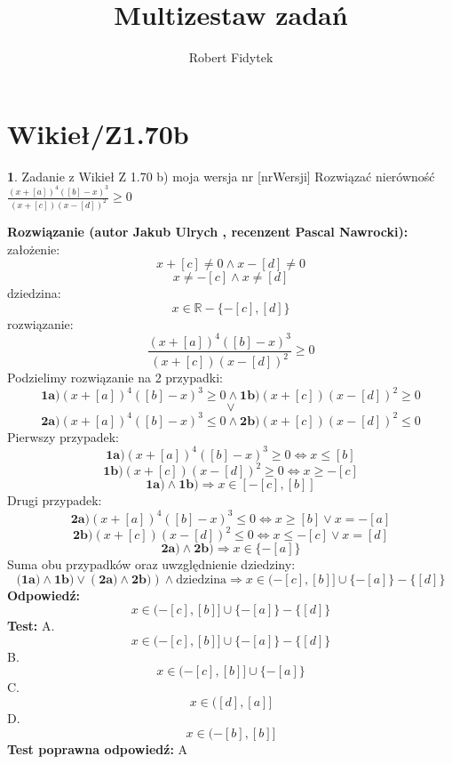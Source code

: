 \documentclass[12pt, a4paper]{article}
\title{Multizestaw zadań}
\author{Robert Fidytek}
\date{}
\theoremstyle{definition} %
\newtheorem{zad}{}
\newcommand{\kategoria}[1]{\section{#1}} %
\newcommand{\zadStart}[1]{\begin{zad}#1\newline} %
\newcommand{\zadStop}{\end{zad}}   %
\newcommand{\rozwStart}[2]{\noindent \textbf{Rozwiązanie (autor #1 , recenzent #2): }\newline} %
\newcommand{\rozwStop}{\newline}                                            %
\newcommand{\odpStart}{\noindent \textbf{Odpowiedź:}\newline}    %
\newcommand{\odpStop}{\newline}                                             %
\newcommand{\testStart}{\noindent \textbf{Test:}\newline} %
\newcommand{\testStop}{\newline} %
\newcommand{\kluczStart}{\noindent \textbf{Test poprawna odpowiedź:}\newline} %
\newcommand{\kluczStop}{\newline} %
\begin{document}
\maketitle


\kategoria{Wikieł/Z1.70b}
\zadStart{Zadanie z Wikieł Z 1.70 b) moja wersja nr [nrWersji]}
Rozwiązać nierówność $\frac{(x+[a])^{4}([b]-x)^{3}}{(x+[c])(x-[d])^{2}}\geq0$
\zadStop
\rozwStart{Jakub Ulrych}{Pascal Nawrocki}
założenie: $$x+[c]\neq0\land x-[d]\neq0$$
$$x\neq-[c]\land x\neq[d]$$
dziedzina:$$x\in \mathbb{R}-\{-[c],[d]\}$$
rozwiązanie:$$\frac{(x+[a])^{4}([b]-x)^{3}}{(x+[c])(x-[d])^{2}}\geq0$$
Podzielimy rozwiązanie na 2 przypadki:
$$\textbf{1a)}(x+[a])^{4}([b]-x)^{3}\geq0 \land \textbf{1b)}(x+[c])(x-[d])^{2}\geq0$$ $$\vee$$ $$\textbf{2a)}(x+[a])^{4}([b]-x)^{3}\leq0 \land \textbf{2b)}(x+[c])(x-[d])^{2}\leq0$$
Pierwszy przypadek:
$$\textbf{1a)}(x+[a])^{4}([b]-x)^{3}\geq0\Leftrightarrow x\leq[b]$$
$$\textbf{1b)}(x+[c])(x-[d])^{2}\geq0\Leftrightarrow x\geq-[c]$$
$$\textbf{1a)}\land\textbf{1b)}\Rightarrow x\in[-[c],[b]]$$
Drugi przypadek:
$$\textbf{2a)}(x+[a])^{4}([b]-x)^{3}\leq0\Leftrightarrow x\geq[b] \vee x=-[a]$$
$$\textbf{2b)}(x+[c])(x-[d])^{2}\leq0\Leftrightarrow x\leq-[c]\vee x=[d]$$
$$\textbf{2a)}\land\textbf{2b)}\Rightarrow x\in\{-[a]\}$$
Suma obu przypadków oraz uwzględnienie dziedziny:
$$(\textbf{1a)}\land\textbf{1b)}\vee(\textbf{2a)}\land\textbf{2b)})\land \text{dziedzina}\Rightarrow x\in(-[c],[b]]\cup\{-[a]\}-\{[d]\}$$
\rozwStop
\odpStart
$$x\in(-[c],[b]]\cup\{-[a]\}-\{[d]\}$$
\odpStop
\testStart
A.$$x\in(-[c],[b]]\cup\{-[a]\}-\{[d]\}$$
B.$$x\in(-[c],[b]]\cup\{-[a]\}$$
C.$$x\in([d],[a]]$$
D.$$x\in(-[b],[b]]$$
\testStop
\kluczStart
A
\kluczStop
\end{document}
